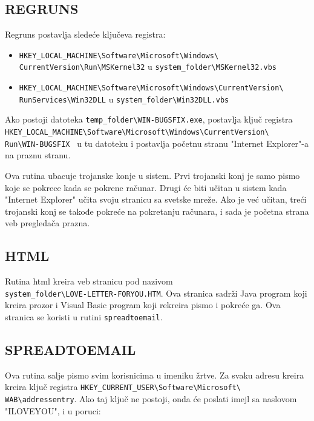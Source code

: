\documentclass[a4paper]{article}
\begin{document}
\subsection{REGRUNS}

Regruns postavlja sledeće ključeva registra:
\begin{itemize}
\item \verb|HKEY_LOCAL_MACHINE\Software\Microsoft\Windows\|
\\ \verb|CurrentVersion\Run\MSKernel32| u \verb|system_folder\MSKernel32.vbs|
\item \verb|HKEY_LOCAL_MACHINE\Software\Microsoft\Windows\CurrentVersion\|
\\ \verb|RunServices\Win32DLL| u \verb|system_folder\Win32DLL.vbs|
\end{itemize}

Ako postoji datoteka \verb|temp_folder\WIN-BUGSFIX.exe|, postavlja ključ registra \verb|HKEY_LOCAL_MACHINE\Software\Microsoft\Windows\CurrentVersion\|
\\ \verb|Run\WIN-BUGSFIX | u tu datoteku i postavlja početnu stranu "Internet Explorer"-a na praznu stranu. 

Ova rutina ubacuje trojanske konje u sistem. Prvi trojanski konj je samo pismo koje se pokrece kada se pokrene računar. Drugi će biti učitan u sistem kada "Internet Explorer" učita svoju stranicu sa svetske mreže. Ako je već učitan, treći trojanski konj se takođe pokreće na pokretanju računara, i sada je početna strana veb pregledača prazna.


\subsection{HTML}

Rutina html kreira veb stranicu pod nazivom \\ \verb|system_folder\LOVE-LETTER-FORYOU.HTM|.
Ova stranica sadrži Java program koji kreira prozor i Visual Basic program koji rekreira pismo i pokreće ga. Ova stranica se koristi u rutini \verb|spreadtoemail|.

\subsection{SPREADTOEMAIL}
Ova rutina salje pismo svim korisnicima u imeniku žrtve. Za svaku adresu kreira kreira ključ registra \verb|HKEY_CURRENT_USER\Software\Microsoft\|
\\ \verb|WAB\addressentry|. Ako taj ključ ne postoji, onda će poslati imejl sa naslovom "ILOVEYOU", i u poruci:
\end{document}
